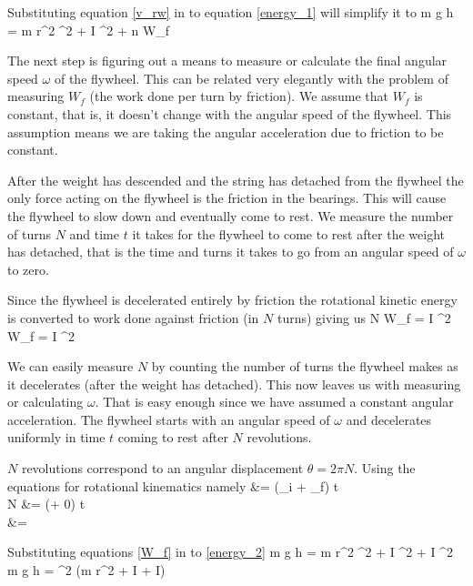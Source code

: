     Substituting equation \eqref{v_rw} in to equation \eqref{energy_1} will simplify it to
    \beq \label{energy_2}
        m g h =  m r^2 \omega^2 +  I \omega^2 + n W_f
    \eeq

    The next step is figuring out a means to measure or calculate the final angular speed $\omega$ of the flywheel. This can be related very elegantly with the problem of measuring $W_f$ (the work done per turn by friction). We assume that $W_f$ is constant, that is, it doesn't change with the angular speed of the flywheel. This assumption means we are taking the angular acceleration due to friction to be constant.

    After the weight has descended and the string has detached from the flywheel the only force acting on the flywheel is the friction in the bearings. This will cause the flywheel to slow down and eventually come to rest. We measure the number of turns $N$ and time $t$ it takes for the flywheel to come to rest after the weight has detached, that is the time and turns it takes to go from an angular speed of $\omega$ to zero.

    Since the flywheel is decelerated entirely by friction the rotational kinetic energy is converted to work done against friction (in $N$ turns) giving us
    \beq \label{W_f}
        N W_f =  I \omega^2 \imply W_f =  I \omega^2
    \eeq

    We can easily measure $N$ by counting the number of turns the flywheel makes as it decelerates (after the weight has detached). This now leaves us with measuring or calculating $\omega$. That is easy enough since we have assumed a constant angular acceleration. The flywheel starts with an angular speed of $\omega$ and decelerates uniformly in time $t$ coming to rest after $N$ revolutions.

    $N$ revolutions correspond to an angular displacement $\theta = 2 \pi N$. Using the equations for rotational kinematics namely
    \beqs \label{omega_Nt}
        \theta &=  (\omega_i + \omega_f) t\\[0.25\baselineskip]
         \pi N &=  (\omega + 0) t\\[0.25\baselineskip]
        \imply \omega &= 
    \eeqs

    Substituting equations \eqref{W_f} in to \eqref{energy_2}
    \beqc
        m g h =  m r^2 \omega^2 +  I \omega^2 +  I \omega^2\\[0.25\baselineskip]
        \imply m g h =  \omega^2 (m r^2 + I +  I)\\
    \eeqc

